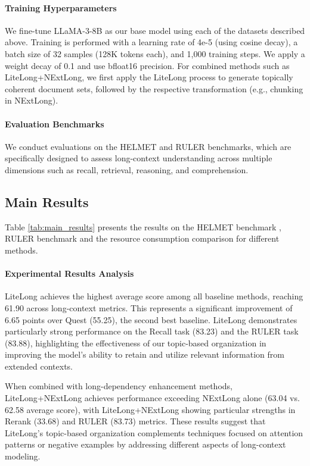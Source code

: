 \documentclass{article}
\theoremstyle{plain}
\theoremstyle{definition}
\theoremstyle{remark}
\begin{document}
    \paragraph{Training Hyperparameters}
    We fine-tune LLaMA-3-8B as our base model using each of the datasets described above. Training is performed with a learning rate of 4e-5 (using cosine decay), a batch size of 32 samples (128K tokens each), and 1,000 training steps. We apply a weight decay of 0.1 and use bfloat16 precision. For combined methods such as LiteLong+NExtLong, we first apply the LiteLong process to generate topically coherent document sets, followed by the respective transformation (e.g., chunking in NExtLong).

    \paragraph{Evaluation Benchmarks} 
    We conduct evaluations on the HELMET \cite{yen2025helmet} and RULER \cite{hsieh2024ruler} benchmarks, which are specifically designed to assess long-context understanding across multiple dimensions such as recall, retrieval, reasoning, and comprehension.


\subsection{Main Results}

    Table \ref{tab:main_results} presents the results on the HELMET benchmark \cite{yen2025helmet}, RULER benchmark \cite{hsieh2024ruler} and the resource consumption comparison for different methods.
    \paragraph{Experimental Results Analysis}
    LiteLong achieves the highest average score among all baseline methods, reaching 61.90 across long-context metrics. This represents a significant improvement of 6.65 points over Quest (55.25), the second best baseline. LiteLong demonstrates particularly strong performance on the Recall task (83.23) and the RULER task (83.88), highlighting the effectiveness of our topic-based organization in improving the model’s ability to retain and utilize relevant information from extended contexts.
    
    When combined with long-dependency enhancement methods, LiteLong+NExtLong achieves performance exceeding NExtLong alone (63.04 vs. 62.58 average score), with LiteLong+NExtLong showing particular strengths in Rerank (33.68) and RULER (83.73) metrics. These results suggest that LiteLong's topic-based organization complements techniques focused on attention patterns or negative examples by addressing different aspects of long-context modeling.
\end{document}

